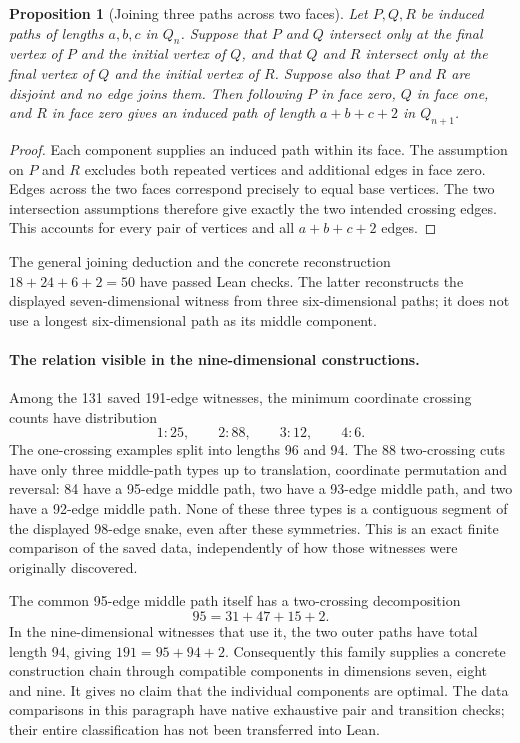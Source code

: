 \documentclass[11pt,a4paper]{article}
\newtheorem{proposition}[theorem]{Proposition}
\theoremstyle{definition}
\theoremstyle{remark}
\begin{document}
\begin{proposition}[Joining three paths across two faces]
Let $P,Q,R$ be induced paths of lengths $a,b,c$ in $Q_n$.
Suppose that $P$ and $Q$ intersect only at the final vertex of $P$
and the initial vertex of $Q$, and that $Q$ and $R$ intersect only
at the final vertex of $Q$ and the initial vertex of $R$.
Suppose also that $P$ and $R$ are disjoint and no edge joins them.
Then following $P$ in face zero, $Q$ in face one, and $R$ in face zero
gives an induced path of length $a+b+c+2$ in $Q_{n+1}$.
\end{proposition}
\begin{proof}
Each component supplies an induced path within its face. The assumption
on $P$ and $R$ excludes both repeated vertices and additional edges
in face zero. Edges across the two faces correspond precisely to
equal base vertices. The two intersection assumptions therefore
give exactly the two intended crossing edges. This accounts for
every pair of vertices and all $a+b+c+2$ edges.
\end{proof}
The general joining deduction and the concrete reconstruction
$18+24+6+2=50$ have passed Lean checks. The latter reconstructs the
displayed seven-dimensional witness from three six-dimensional paths;
it does not use a longest six-dimensional path as its middle component.

\paragraph{The relation visible in the nine-dimensional constructions.}
Among the 131 saved 191-edge witnesses, the minimum coordinate crossing
counts have distribution
\[
1:25,\qquad 2:88,\qquad 3:12,\qquad 4:6.
\]
The one-crossing examples split into lengths 96 and 94. The 88
two-crossing cuts have only three middle-path types up to translation,
coordinate permutation and reversal: 84 have a 95-edge middle path,
two have a 93-edge middle path, and two have a 92-edge middle path.
None of these three types is a contiguous segment of the displayed
98-edge snake, even after these symmetries. This is an exact finite
comparison of the saved data, independently of how those witnesses
were originally discovered.

The common 95-edge middle path itself has a two-crossing decomposition
\[
95=31+47+15+2.
\]
In the nine-dimensional witnesses that use it, the two outer paths
have total length 94, giving $191=95+94+2$.
Consequently this family supplies a concrete construction chain
through compatible components in dimensions seven, eight and nine.
It gives no claim that the individual components are optimal.
The data comparisons in this paragraph have native exhaustive pair
and transition checks; their entire classification has not been
transferred into Lean.
\end{document}
